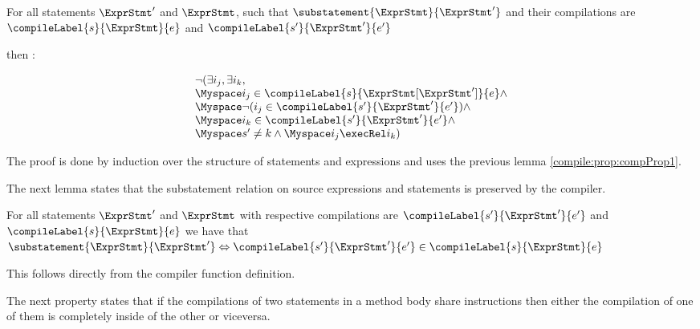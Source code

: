 \begin{compProp2}\label{compile:prop:compProp2}
 For all  statements $\ExprStmt'$  and $\ExprStmt$, such that $\substatement{\ExprStmt }{\ExprStmt'} $
and their  compilations  are $\compileLabel{s}{\ExprStmt}{e}$ and  $\compileLabel{s'}{\ExprStmt'}{e'}$


then :

$$\begin{array}{l} \neg (\exists i_j, \exists i_k,  \\   
                       \Myspace   i_j \in \compileLabel{s}{\ExprStmt[\ExprStmt']}{e} \wedge\\
		       \Myspace \neg (i_j \in \compileLabel{s'}{\ExprStmt'}{e'} )   \wedge \\
		       \Myspace  i_k \in \compileLabel{s'}{\ExprStmt'}{e'}  \wedge \\
		       \Myspace s' \neq k   \wedge 
		       \Myspace i_j \execRel i_k )


  \end{array}$$ 

\end{compProp2}

The proof is done by induction over the structure of statements and expressions  and uses the previous lemma \ref{compile:prop:compProp1}.


 
The next lemma  states that the substatement relation on source expressions and statements is preserved
by the compiler.
\begin{compProp11}\label{compile:prop:compPropSubstmt}
For all statements $\ExprStmt'$ and $\ExprStmt $ with
respective compilations are $\compileLabel{s'}{\ExprStmt'}{e'}$ and  $\compileLabel{s}{\ExprStmt}{e}$ 
we have  that 
  $  \substatement{\ExprStmt }{\ExprStmt'} \Leftrightarrow \compileLabel{s'}{\ExprStmt'}{e'} \in  \compileLabel{s}{\ExprStmt}{e} $ 
\end{compProp11}
This follows directly from the compiler function definition.

The next property  states 
that if the compilations of two
statements in a method body share instructions then 
either the compilation of one of them is completely inside of the other or viceversa.


